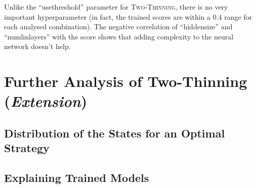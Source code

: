 Unlike the ``use\textunderscore threshold'' parameter for \textsc{Two-Thinning}, there is no very important hyperparameter (in fact, the trained scores are within a $0.4$ range for each analysed combination). The negative correlation of ``hidden\textunderscore size'' and ``num\textunderscore lin\textunderscore layers'' with the score shows that adding complexity to the neural network doesn't help.

\section{Further Analysis of Two-Thinning (\textit{Extension})}


\subsection{Distribution of the States for an Optimal Strategy}



\subsection{Explaining Trained Models}